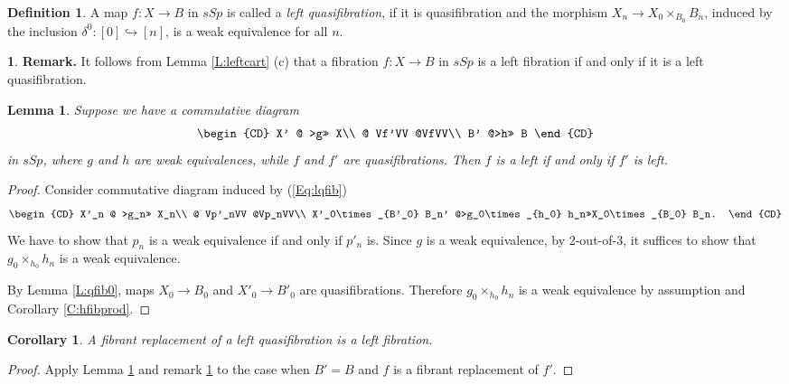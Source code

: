 \documentclass[12pt]{amsart}
\theoremstyle{plain}
\newtheorem{Cor}[Thm]{Corollary}
\newtheorem{Lem}[Thm]{Lemma}
\theoremstyle{definition}
\newtheorem{Def}[Thm]{Definition}
\newtheorem{Emp}[Thm]{}
\numberwithin{equation}{section}
\newcommand{\form}[1]{(\ref{Eq:#1})}
\newcommand{\hra}{\hookrightarrow}
\newcommand{\dt}{\delta}
\newcommand{\rl}[1]{Lemma \ref{L:#1}}
\newcommand{\re}[1]{\ref{E:#1}}
\newcommand{\rco}[1]{Corollary \ref{C:#1}}
\begin{document}
\begin{Def} \label{D:lqfib}
A map $f:X\to B$ in $sSp$ is called a {\em left quasifibration},
if it is quasifibration and the morphism $X_n\to X_0\times_{B_0}
B_n$, induced by the inclusion $\dt^0:[0]\hra[n]$, is a weak
equivalence for all $n$.
\end{Def}

\begin{Emp} \label{E:remlqfib}
{\bf Remark.} It follows from \rl{leftcart} (c) that a fibration
$f:X\to B$ in $sSp$ is a left fibration if and only if it is a
left quasifibration.
\end{Emp}

\begin{Lem} \label{L:lqf}
Suppose we have a commutative diagram
%
\begin{equation} \label{Eq:lqfib}
\begin{CD}
X' @ >g>> X\\
@ Vf'VV @VfVV\\
B' @>h>> B
\end{CD}
\end{equation}
%
in $sSp$, where $g$ and $h$  are weak equivalences, while $f$ and
$f'$ are quasifibrations. Then $f$ is a left if and only if $f'$
is left.
\end{Lem}

\begin{proof}
Consider commutative diagram induced by \form{lqfib}
%
\[
\begin{CD}
X'_n @ >g_n>> X_n\\
@ Vp'_nVV @Vp_nVV\\
X'_0\times_{B'_0} B_n' @>g_0\times_{h_0} h_n>>X_0\times_{B_0} B_n. 
\end{CD}
\]
%
We have to show that $p_n$  is a weak
equivalence if and only if $p'_n$ is. Since $g$ is a weak
equivalence, by 2-out-of-3, it suffices to show
that $g_0\times_{h_0}h_n$ is a weak equivalence.

By \rl{qfib0}, maps $X_0\to B_0$ and $X'_0\to B'_0$ are
quasifibrations. Therefore $g_0\times_{h_0}h_n$ is a weak
equivalence by assumption and \rco{hfibprod}.
\end{proof}

\begin{Cor} \label{C:lqf}
A fibrant replacement of a left quasifibration is a left fibration.
\end{Cor}

\begin{proof}
Apply \rl{lqf} and remark \re{remlqfib} to the case when $B'=B$
and $f$ is a fibrant replacement of $f'$. 
\end{proof}
\end{document}
